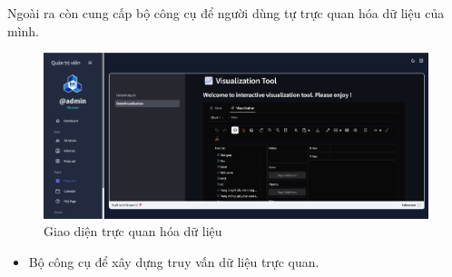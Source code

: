 Ngoài ra còn cung cấp bộ công cụ để người dùng tự trực quan hóa dữ liệu của mình.
\begin{figure}[H]
    \centering
    \includegraphics[width=0.75\linewidth]{images/admin2.jpg}
    \vspace{0.6cm}
    \caption{Giao diện trực quan hóa dữ liệu}
\end{figure}

\begin{itemize}
    \item Bộ công cụ để xây dựng truy vấn dữ liệu trực quan.
\end{itemize}
